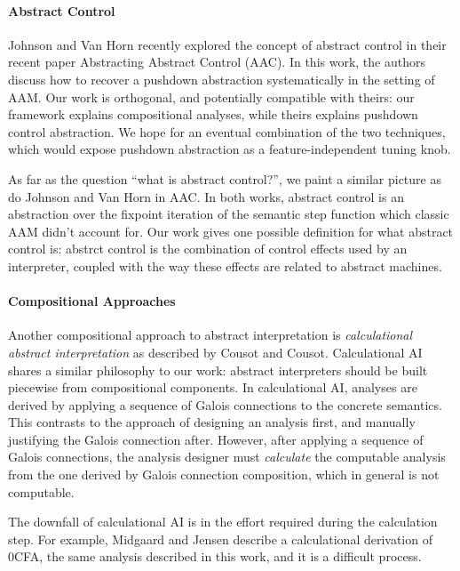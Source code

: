 \documentclass{article}
\begin{document}
\paragraph{Abstract Control}
Johnson and Van Horn recently explored the concept of abstract control in their recent paper Abstracting Abstract Control 
(AAC)\cite{johnson:2014:AAC}.
In this work, the authors discuss how to recover a pushdown abstraction systematically in the setting of AAM.
Our work is orthogonal, and potentially compatible with theirs: our framework explains compositional analyses, while theirs explains pushdown control abstraction.
We hope for an eventual combination of the two techniques, which would expose pushdown abstraction as a feature-independent tuning knob.

As far as the question “what is abstract control?”, we paint a similar picture as do Johnson and Van Horn in AAC.
In both works, abstract control is an abstraction over the fixpoint iteration of the semantic step function which classic AAM didn't account for.
Our work gives one possible definition for what abstract control is: 
  abstrct control is the combination of control effects used by an interpreter,
  coupled with the way these effects are related to abstract machines.

\paragraph{Compositional Approaches}
Another compositional approach to abstract interpretation is \emph{calculational abstract interpretation}\cite{cousot:1999:calculational} 
  as described by Cousot and Cousot.
Calculational AI shares a similar philosophy to our work: abstract interpreters should be built piecewise from compositional components.
In calculational AI, analyses are derived by applying a sequence of Galois connections to the concrete semantics.
This contrasts to the approach of designing an analysis first, and manually justifying the Galois connection after.
However, after applying a sequence of Galois connections, 
  the analysis designer must \emph{calculate} the computable analysis from the one derived by Galois connection composition,
  which in general is not computable.

The downfall of calculational AI is in the effort required during the calculation step.
For example, Midgaard and Jensen\cite{midtgaard:2008:calculational-cfa} describe a calculational derivation of 0CFA, the same analysis described in this work, and it is a difficult process.
\end{document}
